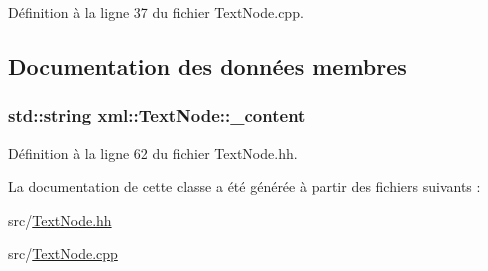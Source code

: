 Définition à la ligne 37 du fichier TextNode.cpp.



\subsection{Documentation des données membres}
\hypertarget{classxml_1_1_text_node_a1c237e716b3f9fd76569d443d838cd25}{
\subsubsection[{\_\-content}]{\setlength{\rightskip}{0pt plus 5cm}std::string {\bf xml::TextNode::\_\-content}}}
\label{classxml_1_1_text_node_a1c237e716b3f9fd76569d443d838cd25}


Définition à la ligne 62 du fichier TextNode.hh.



La documentation de cette classe a été générée à partir des fichiers suivants :\begin{DoxyCompactItemize}
\item 
src/\hyperlink{_text_node_8hh}{TextNode.hh}\item 
src/\hyperlink{_text_node_8cpp}{TextNode.cpp}\end{DoxyCompactItemize}
